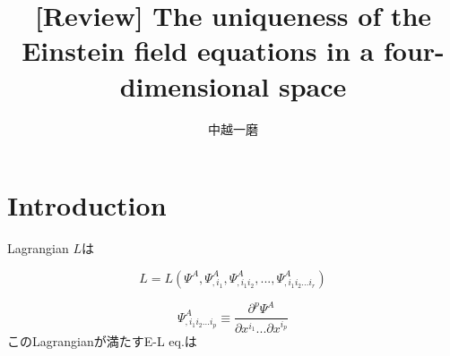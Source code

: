 \documentclass[12pt, a4paper]{jsarticle}
\title{[Review] The uniqueness of the Einstein field equations in a four-dimensional space}
\author{中越一磨}
\begin{document}
\maketitle

\section{Introduction}
Lagrangian \(L\)は

\begin{equation}
  L=L(\Psi ^A, \Psi ^A _{,i_1}, \Psi ^A _{,i_1 i_2}, ... , \Psi ^A _{,i_1 i_2 ... i_r})
\end{equation} 

\begin{equation}
  \Psi ^A _{,i_1 i_2 ... i_p} \equiv  \dfrac{\partial ^p \Psi^A}{\partial x^{i_1} ...\partial x^{i_p}}
\end{equation}
このLagrangianが満たすE-L eq.は


\section{}

\begin{thebibliography}{9}
\end{thebibliography}
\end{document}
